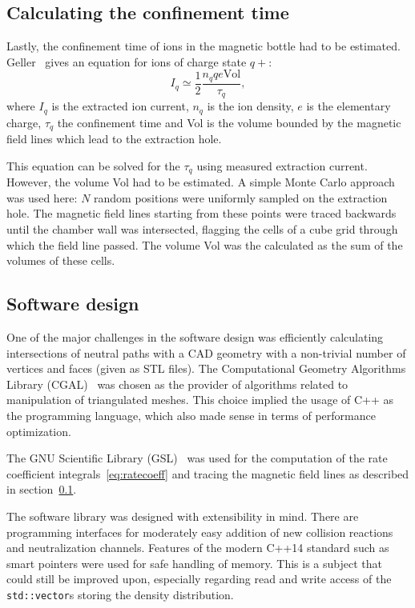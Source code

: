 \documentclass[a4paper,twoside,12pt]{article}
\begin{document}
\subsection{Calculating the confinement time}
\label{sec:confinement}
Lastly, the confinement time of ions in the magnetic bottle had to be estimated. Geller~\cite{geller:ecr} gives an equation for ions of charge state $q+$:
\begin{equation}
    \label{eq:confinement_time}
    I_q \simeq \frac{1}{2} \frac{n_q q e \mathrm{Vol}}{\tau_q},
\end{equation}
where $I_q$ is the extracted ion current, $n_q$ is the ion density, $e$ is the elementary charge, $\tau_q$ the confinement time and Vol is the volume bounded by the magnetic field lines which lead to the extraction hole.

This equation can be solved for the $\tau_q$ using measured extraction current. However, the volume Vol had to be estimated. A simple Monte Carlo approach was used here: $N$ random positions were uniformly sampled on the extraction hole. The magnetic field lines starting from these points were traced backwards until the chamber wall was intersected, flagging the cells of a cube grid through which the field line passed. The volume Vol was the calculated as the sum of the volumes of these cells.

\subsection{Software design}
One of the major challenges in the software design was efficiently calculating intersections of neutral paths with a CAD geometry with a non-trivial number of vertices and faces (given as STL files). The Computational Geometry Algorithms Library (\textsc{CGAL})~\cite{cgal} was chosen as the provider of algorithms related to manipulation of triangulated meshes. This choice implied the usage of \textsc{C++} as the programming language, which also made sense in terms of performance optimization.

The GNU Scientific Library (\textsc{GSL})~\cite{gsl} was used for the computation of the rate coefficient integrals~\eqref{eq:ratecoeff} and tracing the magnetic field lines as described in section~\ref{sec:confinement}.

The software library was designed with extensibility in mind. There are programming interfaces for moderately easy addition of new collision reactions and neutralization channels. Features of the modern \textsc{C++14} standard such as smart pointers were used for safe handling of memory. This is a subject that could still be improved upon, especially regarding read and write access of the \texttt{std::vector}s storing the density distribution.
\end{document}
